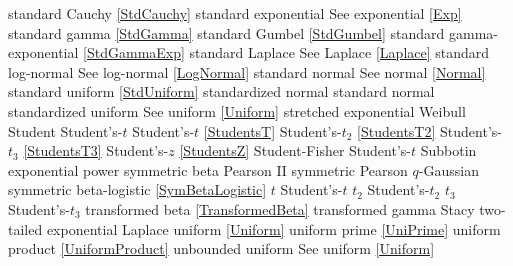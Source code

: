 standard Cauchy				\dotfill	\eqref{StdCauchy} 					\ncite	%
standard exponential				\dotfill	See exponential \eqref{Exp} 			\ncite	%
standard gamma 				\dotfill	\eqref{StdGamma} 					\ncite	%
standard Gumbel 				\dotfill	\eqref{StdGumbel} 					\ncite	%
standard gamma-exponential		\dotfill	\eqref{StdGammaExp} 				\ncite	%
standard Laplace				\dotfill	See Laplace \eqref{Laplace}			\ncite	%
standard log-normal				\dotfill	See log-normal \eqref{LogNormal} 		\ncite	%
standard normal 				\dotfill	See normal \eqref{Normal} 			\ncite	%
standard uniform				\dotfill	\eqref{StdUniform}					\ncite	%
standardized normal 				\dotfill	standard normal					\ncite	%
standardized uniform 			\dotfill	See uniform \eqref{Uniform}			\ncite	%
stretched exponential 			\dotfill	Weibull 								
Student						\dotfill 	Student's-$t$						\ncite	%
Student's-$t$					\dotfill	\eqref{StudentsT}  					\ncite	%
Student's-$t_2$					\dotfill	\eqref{StudentsT2}  					\ncite	%
Student's-$t_3$					\dotfill	\eqref{StudentsT3}  					\ncite	
Student's-$z$					\dotfill	\eqref{StudentsZ}					\ncite	%
Student-Fisher					\dotfill	Student's-$t$							%
Subbotin						\dotfill	exponential power					\ncite
symmetric beta					\dotfill	Pearson II							\ncite	%
symmetric Pearson				\dotfill	$q$-Gaussian						\mcite{\self}		%
symmetric beta-logistic			\dotfill	\eqref{SymBetaLogistic}				\mcite{\self}
%
$t$							\dotfill	Student's-$t$ 						\ncite	%
$t_2$						\dotfill	Student's-$t_2$ 					\ncite	%
$t_3$						\dotfill	Student's-$t_3$ 					\ncite
transformed beta				\dotfill	\eqref{TransformedBeta} 				\ncite	%
transformed gamma				\dotfill	Stacy 							\ncite %
two-tailed exponential			\dotfill	Laplace							\ncite %
%
uniform  						\dotfill	\eqref{Uniform}						\ncite 	%
uniform prime					\dotfill	\eqref{UniPrime}					\ncite	%
uniform product 				\dotfill	\eqref{UniformProduct}				\ncite 	%
%
unbounded uniform 				\dotfill	See uniform \eqref{Uniform}			\ncite	%
